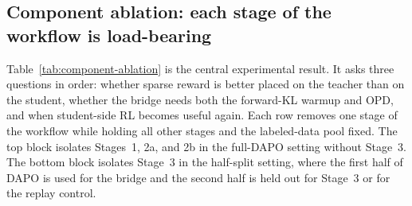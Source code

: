 \documentclass{article}
\begin{document}
\subsection{Component ablation: each stage of the workflow is load-bearing}
\label{sec:exp-ablation}

Table~\ref{tab:component-ablation} is the central experimental result. It asks three questions in order: whether sparse reward is better placed on the teacher than on the student, whether the bridge needs both the forward-KL warmup and OPD, and when student-side RL becomes useful again. Each row removes one stage of the workflow while holding all other stages and the labeled-data pool fixed. The top block isolates Stages~1, 2a, and 2b in the full-DAPO setting without Stage~3. The bottom block isolates Stage~3 in the half-split setting, where the first half of DAPO is used for the bridge and the second half is held out for Stage~3 or for the replay control.
\end{document}
